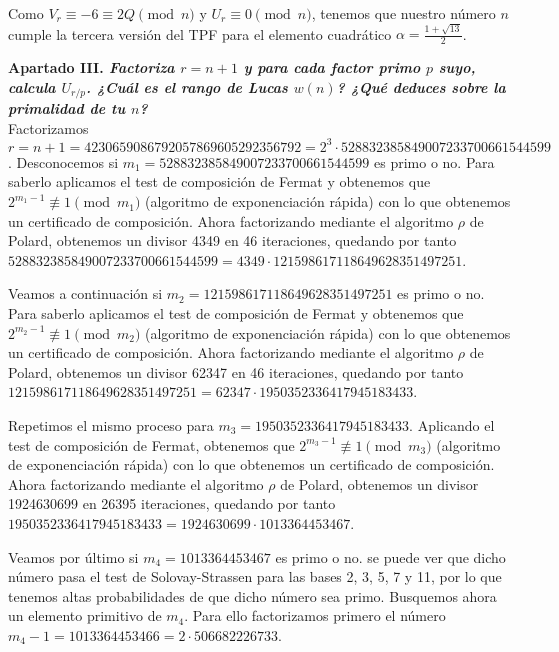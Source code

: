\documentclass[fleqn]{article}
\begin{document}
    Como $V_r \equiv -6 \equiv 2Q \pmod{n}$ y $U_r \equiv 0 \pmod{n}$, tenemos que nuestro número $n$ cumple la tercera versión del TPF para el elemento cuadrático
    $\alpha = \frac{1 + \sqrt{13}}{2}$.
    
        



    \newpage
    \textbf{Apartado III. \textit{Factoriza $r = n+1$ y para cada factor primo $p$ suyo, calcula $U_{r/p}$.
            ¿Cuál es el rango de Lucas $w(n)$? ¿Qué deduces sobre la primalidad de tu $n$?}} \\
    Factorizamos $r = n+1 = 4230659086792057869605292356792 = 2^3 \cdot 528832385849007233700661544599$. Desconocemos si
    $m_1 = 528832385849007233700661544599$ es primo o no. Para saberlo aplicamos el test de composición de Fermat y obtenemos que 
    $2^{m_1 -1} \not\equiv 1 \pmod{m_1}$ (algoritmo de exponenciación rápida) con lo que obtenemos un certificado de composición. Ahora factorizando mediante el algoritmo $\rho$
    de Polard, obtenemos un divisor 4349 en 46 iteraciones, quedando por tanto $528832385849007233700661544599 = 4349 \cdot 121598617118649628351497251$.

    Veamos a continuación si $m_2 = 121598617118649628351497251$ es primo o no. Para saberlo aplicamos el test de composición de Fermat y
    obtenemos que $2^{m_2 -1} \not\equiv 1 \pmod{m_2}$ (algoritmo de exponenciación rápida) con lo que obtenemos un certificado de composición. 
    Ahora factorizando mediante el algoritmo $\rho$ de Polard, obtenemos un divisor 62347 en 46 iteraciones, quedando por tanto $121598617118649628351497251 = 62347 \cdot 1950352336417945183433$.
    
    Repetimos el mismo proceso para $m_3 = 1950352336417945183433$. Aplicando el test de composición de Fermat, obtenemos que 
    $2^{m_3 -1} \not\equiv 1 \pmod{m_3}$ (algoritmo de exponenciación rápida) con lo que obtenemos un certificado de composición.
    Ahora factorizando mediante el algoritmo $\rho$ de Polard, obtenemos un divisor 1924630699 en 26395 iteraciones, quedando por tanto 
    $1950352336417945183433 = 1924630699 \cdot 1013364453467$.
    
    Veamos por último si $m_4 = 1013364453467$ es primo o no. se puede ver que dicho número pasa el test de Solovay-Strassen para las bases
    2, 3, 5, 7 y 11, por lo que tenemos altas probabilidades de que dicho número sea primo. Busquemos ahora un elemento primitivo de $m_4$.
    Para ello factorizamos primero el número $m_4 - 1 = 1013364453466 = 2 \cdot 506682226733$. 
    
\end{document}
